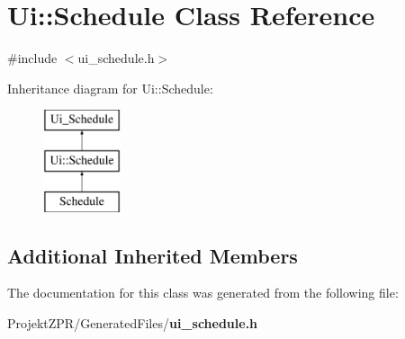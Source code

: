 \section{Ui\-:\-:Schedule Class Reference}
\label{class_ui_1_1_schedule}


{\ttfamily \#include $<$ui\-\_\-schedule.\-h$>$}

Inheritance diagram for Ui\-:\-:Schedule\-:\begin{figure}[H]
\begin{center}
\leavevmode
\includegraphics[height=3.000000cm]{class_ui_1_1_schedule}
\end{center}
\end{figure}
\subsection*{Additional Inherited Members}


The documentation for this class was generated from the following file\-:\begin{DoxyCompactItemize}
\item 
Projekt\-Z\-P\-R/\-Generated\-Files/{\bf ui\-\_\-schedule.\-h}\end{DoxyCompactItemize}
